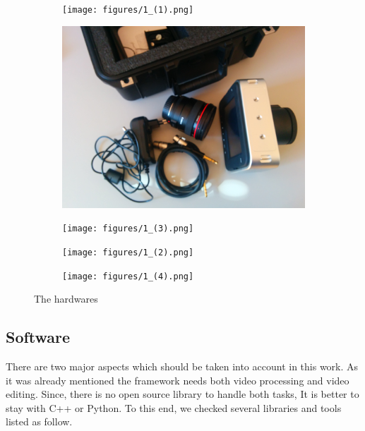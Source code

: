 \documentclass[[12pt,DIV14,BCOR12mm,a4paper,footexclude,headinclude,halfparskip-,twoside,openright,cleardoubleempty,idxtotoc,bibtotoc]{article}
\begin{document}
\begin{figure}[ht]
	\centering
	\begin{subfigure}[b]{0.18\textwidth}
	       \texttt{[image: figures/1\_(1).png]}
	       \caption{}
		\label{fig_hw_a}
	\end{subfigure} 
	\begin{subfigure}[b]{0.18\textwidth}
	      \includegraphics[width=\textwidth]{figures/1_(2).jpg}
	      \caption{}
		\label{fig_hw_b}
	\end{subfigure}	        
	\begin{subfigure}[b]{0.18\textwidth}
	       \texttt{[image: figures/1\_(3).png]}
	       \caption{}
	\label{fig_hw_c}
	\end{subfigure}
	\begin{subfigure}[b]{0.18\textwidth}
	      \texttt{[image: figures/1\_(2).png]}
	      \caption{}
		\label{fig_hw_d}
	\end{subfigure}
	\begin{subfigure}[b]{0.18\textwidth}
	      \texttt{[image: figures/1\_(4).png]}
	      \caption{}
		\label{fig_hw_e}
	\end{subfigure}
	\caption{The hardwares}
	\label{fig_hw}
\end{figure}



\subsection{Software}

There are two major aspects which should be taken into account in this work. As it was already mentioned the framework needs both video processing and video editing. Since, there is no open source library to handle both tasks, It is better to stay with C++ or Python. To this end, we checked several libraries and tools listed as follow.
\end{document}
